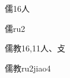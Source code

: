\begin{Entry}{儒}{16}{⼈}
  \begin{Phonetics}{儒}{ru2}
  \end{Phonetics}
\end{Entry}

\begin{Entry}{儒教}{16,11}{⼈、⽁}
  \begin{Phonetics}{儒教}{ru2jiao4}
  \end{Phonetics}
\end{Entry}


